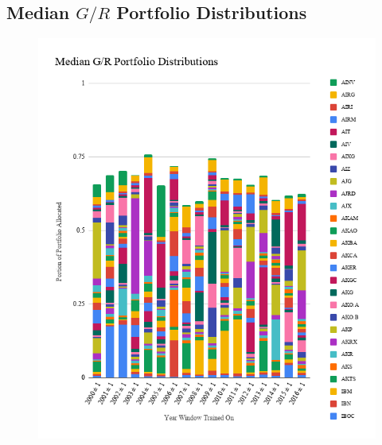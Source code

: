 \documentclass[11pt]{article}
\begin{document}
\subsection{Median \(G/R\) Portfolio Distributions}\label{apd:MedianGRPortfolioDistributions}
    \begin{figure}[H]
        \includegraphics[width=\textwidth]{MedianGRPortfolioDistributions}
    \end{figure}
\end{document}

